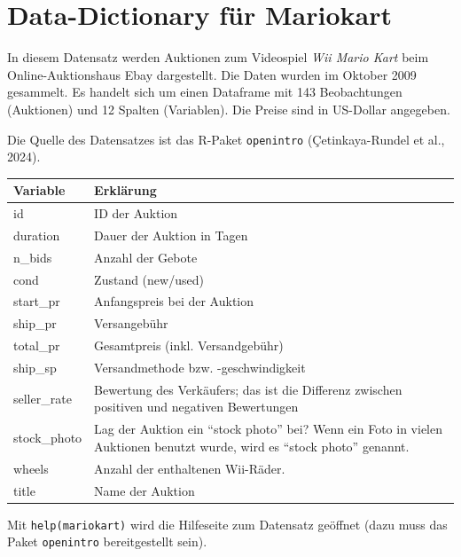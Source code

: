 \documentclass[
  letterpaper,
  oneside,
  open=any]{scrbook}
\theoremstyle{definition}
\theoremstyle{definition}
\theoremstyle{definition}
\theoremstyle{remark}
\begin{document}
\chapter{Data-Dictionary für Mariokart}\label{sec-data-dict}

In diesem Datensatz werden Auktionen zum Videospiel \emph{Wii Mario
Kart} beim Online-Auktionshaus Ebay dargestellt. Die Daten wurden im
Oktober 2009 gesammelt. Es handelt sich um einen Dataframe mit 143
Beobachtungen (Auktionen) und 12 Spalten (Variablen). Die Preise sind in
US-Dollar angegeben.

Die Quelle des Datensatzes ist das R-Paket \texttt{openintro}
(Çetinkaya-Rundel et al., 2024).

\begin{longtable}[]{@{}
  >{\raggedright\arraybackslash}p{}
  >{\raggedright\arraybackslash}p{}@{}}
\toprule\noalign{}
\begin{minipage}[b]{\linewidth}\raggedright
Variable
\end{minipage} & \begin{minipage}[b]{\linewidth}\raggedright
Erklärung
\end{minipage} \\
\midrule\noalign{}
\endhead
\bottomrule\noalign{}
\endlastfoot
id & ID der Auktion \\
duration & Dauer der Auktion in Tagen \\
n\_bids & Anzahl der Gebote \\
cond & Zustand (new/used) \\
start\_pr & Anfangspreis bei der Auktion \\
ship\_pr & Versangebühr \\
total\_pr & Gesamtpreis (inkl. Versandgebühr) \\
ship\_sp & Versandmethode bzw. -geschwindigkeit \\
seller\_rate & Bewertung des Verkäufers; das ist die Differenz zwischen
positiven und negativen Bewertungen \\
stock\_photo & Lag der Auktion ein \enquote{stock photo} bei? Wenn ein
Foto in vielen Auktionen benutzt wurde, wird es \enquote{stock photo}
genannt. \\
wheels & Anzahl der enthaltenen Wii-Räder. \\
title & Name der Auktion \\
\end{longtable}

Mit \texttt{help(mariokart)} wird die Hilfeseite zum Datensatz geöffnet
(dazu muss das Paket \texttt{openintro} bereitgestellt sein).


\backmatter
\end{document}
